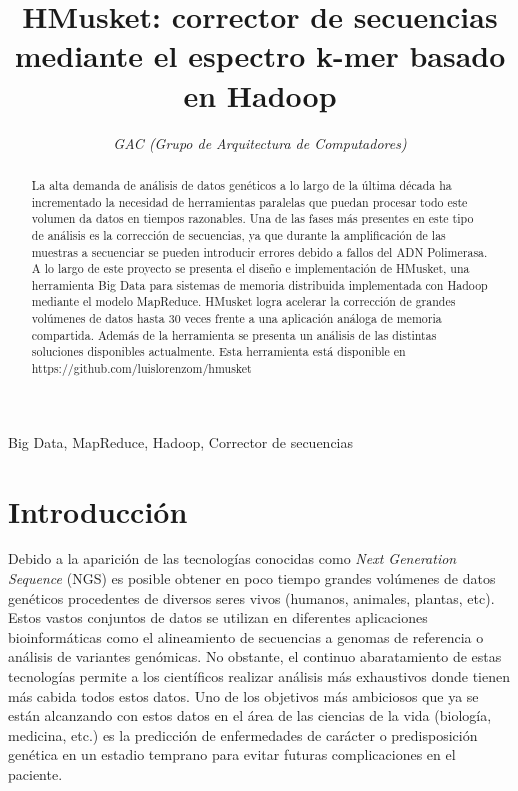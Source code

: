 \documentclass[conference]{IEEEtran}
\begin{document}
\title{HMusket: corrector de secuencias mediante el espectro k-mer basado en Hadoop}

\author{
	\textit{GAC (Grupo de Arquitectura de Computadores)}\\
}

\maketitle

\begin{abstract}
La alta demanda de análisis de datos genéticos a lo largo de la última década ha incrementado la necesidad de herramientas paralelas que puedan procesar todo este volumen da datos en tiempos razonables. Una de las fases más presentes en este tipo de análisis es la corrección de secuencias, ya que durante la amplificación de las muestras a secuenciar se pueden introducir errores debido a fallos del ADN Polimerasa. A lo largo de este proyecto se presenta el diseño e implementación de HMusket, una herramienta Big Data para sistemas de memoria distribuida implementada con Hadoop mediante el modelo MapReduce. HMusket logra acelerar la corrección de grandes volúmenes de datos hasta 30 veces frente a una aplicación análoga de memoria compartida. Además de la herramienta se presenta un análisis de las distintas soluciones disponibles actualmente. Esta herramienta está disponible en https://github.com/luislorenzom/hmusket
\end{abstract}

\begin{IEEEkeywords}
Big Data, MapReduce, Hadoop, Corrector de secuencias
\end{IEEEkeywords}

\section{Introducción}
Debido a la aparición de las tecnologías conocidas como \textit{Next Generation Sequence} (NGS)\cite{ngs} es posible obtener en poco tiempo grandes volúmenes de datos genéticos procedentes de diversos seres vivos (humanos, animales, plantas, etc). Estos vastos conjuntos de datos se utilizan en diferentes aplicaciones bioinformáticas como el alineamiento de secuencias a genomas de referencia o análisis de variantes genómicas. 
No obstante, el continuo abaratamiento de estas tecnologías permite a los científicos realizar análisis más exhaustivos donde tienen más cabida todos estos datos. Uno de los objetivos más ambiciosos que ya se están alcanzando con estos datos en el área de las ciencias de la vida (biología, medicina, etc.) es la predicción de enfermedades de carácter o predisposición genética en un estadio temprano para evitar futuras complicaciones en el paciente.
\end{document}
